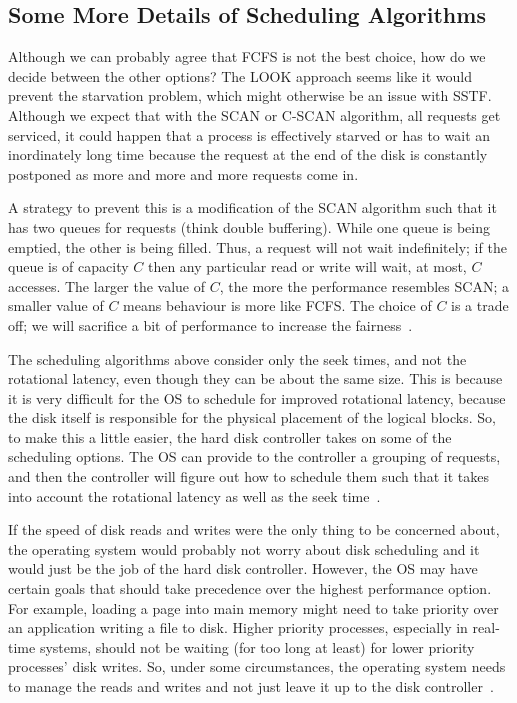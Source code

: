 \subsection*{Some More Details of Scheduling Algorithms}

Although we can probably agree that FCFS is not the best choice, how do we decide between the other options? The LOOK approach seems like it would prevent the starvation problem, which might otherwise be an issue with SSTF. Although we expect that with the SCAN or C-SCAN algorithm, all requests get serviced, it could happen that a process is effectively starved or has to wait an inordinately long time because the request at the end of the disk is constantly postponed as more and more and more requests come in. 

A strategy to prevent this is a modification of the SCAN algorithm such that it has two queues for requests (think double buffering). While one queue is being emptied, the other is being filled. Thus, a request will not wait indefinitely; if the queue is of capacity $C$ then any particular read or write will wait, at most, $C$ accesses. The larger the value of $C$, the more the performance resembles SCAN; a smaller value of $C$ means behaviour is more like FCFS. The choice of $C$ is a trade off; we will sacrifice a bit of performance to increase the fairness~\cite{osi}.

The scheduling algorithms above consider only the seek times, and not the rotational latency, even though they can be about the same size. This is because it is very difficult for the OS to schedule for improved rotational latency, because the disk itself is responsible for the physical placement of the logical blocks. So, to make this a little easier, the hard disk controller takes on some of the scheduling options. The OS can provide to the controller a grouping of requests, and then the controller will figure out how to schedule them such that it takes into account the rotational latency as well as the seek time~\cite{osc}.

If the speed of disk reads and writes were the only thing to be concerned about, the operating system would probably not worry about disk scheduling and it would just be the job of the hard disk controller. However, the OS may have certain goals that should take precedence over the highest performance option. For example, loading a page into main memory might need to take priority over an application writing a file to disk. Higher priority processes, especially in real-time systems, should not be waiting (for too long at least) for lower priority processes' disk writes. So, under some circumstances, the operating system needs to manage the reads and writes and not just leave it up to the disk controller~\cite{osc}.




